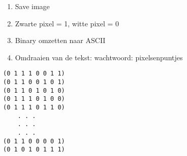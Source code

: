 \begin{enumerate}
  \item Save image
  \item Zwarte pixel = 1, witte pixel = 0
  \item Binary omzetten naar ASCII
  \item Omdraaien van de tekst: wachtwoord: pixelsenpuntjes
\end{enumerate}
\begin{lstlisting}
(0 1 1 1 0 0 1 1)
(0 1 1 0 0 1 0 1)
(0 1 1 0 1 0 1 0)
(0 1 1 1 0 1 0 0)
(0 1 1 1 0 1 1 0)
	. . .
	. . .
	. . .
(0 1 1 0 0 0 0 1)
(0 1 0 1 0 1 1 1)
\end{lstlisting}